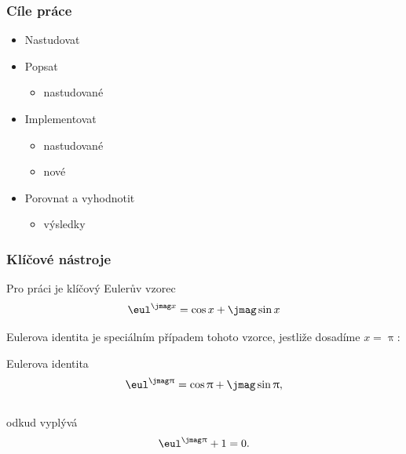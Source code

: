 \documentclass[%
  12pt,       				%
	t,                  %
	aspectratio=1610,   %
	unicode,						%
czech,              %
]{beamer}				    	%
\begin{document}
\vypninavigacnisymboly

\vytvortitulku

\begin{frame} 
	\frametitle{Cíle práce}
	\begin{itemize}
			\item Nastudovat
			\item Popsat
				\begin{itemize}
					\item nastudované
				\end{itemize}
			\item Implementovat
				\begin{itemize}
					\item nastudované
					\item nové
				\end{itemize}
			\item Porovnat a vyhodnotit
				\begin{itemize}
						\item výsledky
				\end{itemize}
	\end{itemize}
\end{frame}

\begin{frame} 
	\frametitle{Klíčové nástroje}

	\begin{alertblock}{Pro práci je klíčový Eulerův vzorec}
		$$\eul^{\jmag x}=\cos x + \jmag\sin x$$
	\end{alertblock}

	\vspace{4ex}
	Eulerova identita je speciálním případem tohoto vzorce, jestliže dosadíme $x=\uppi$:

	\begin{block}{Eulerova identita}
		$$\eul^{\jmag \uppi}=\cos \uppi + \jmag\sin \uppi,$$\\
		odkud vyplývá
		$$\eul^{\jmag \uppi}+1=0.$$
	\end{block}
\end{frame} 
\end{document}
